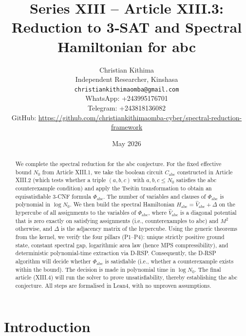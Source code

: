 \documentclass[11pt,a4paper]{article}
\title{Series XIII – Article XIII.3: Reduction to 3‑SAT and Spectral Hamiltonian for abc}
\author{Christian Kithima \\
Independent Researcher, Kinshasa \\
\texttt{christiankithimaomba@gmail.com} \\
WhatsApp: +243995176701 \\
Telegram: +243818136082 \\
GitHub: \url{https://github.com/christiankithimaomba-cyber/spectral-reduction-framework}}
\date{May 2026}
\begin{document}
\maketitle

\begin{abstract}
We complete the spectral reduction for the abc conjecture. For the fixed effective bound $N_0$ from Article XIII.1, we take the boolean circuit $C_{\text{abc}}$ constructed in Article XIII.2 (which tests whether a triple $(a,b,c)$ with $a,b,c\le N_0$ satisfies the abc counterexample condition) and apply the Tseitin transformation to obtain an equisatisfiable 3‑CNF formula $\Phi_{\text{abc}}$. The number of variables and clauses of $\Phi_{\text{abc}}$ is polynomial in $\log N_0$. We then build the spectral Hamiltonian $H_{\text{abc}} = \hat{V}_{\text{abc}} + \Delta$ on the hypercube of all assignments to the variables of $\Phi_{\text{abc}}$, where $\hat{V}_{\text{abc}}$ is a diagonal potential that is zero exactly on satisfying assignments (i.e., counterexamples to abc) and $M^2$ otherwise, and $\Delta$ is the adjacency matrix of the hypercube. Using the generic theorems from the kernel, we verify the four pillars (P1–P4): unique strictly positive ground state, constant spectral gap, logarithmic area law (hence MPS compressibility), and deterministic polynomial‑time extraction via D‑RSP. Consequently, the D‑RSP algorithm will decide whether $\Phi_{\text{abc}}$ is satisfiable (i.e., whether a counterexample exists within the bound). The decision is made in polynomial time in $\log N_0$. The final article (XIII.4) will run the solver to prove unsatisfiability, thereby establishing the abc conjecture. All steps are formalised in Lean4, with no unproven assumptions.
\end{abstract}

\tableofcontents

\section{Introduction}
\end{document}
